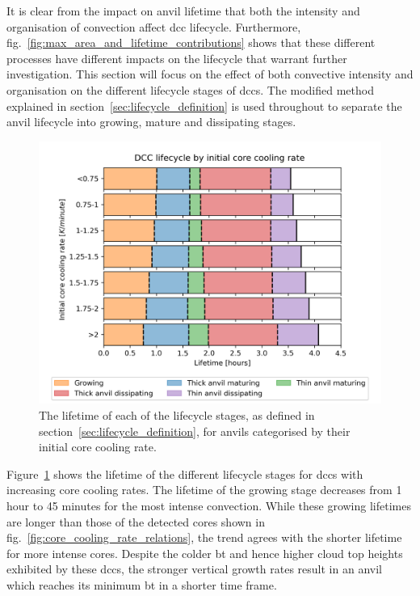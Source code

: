 It is clear from the impact on anvil lifetime that both the intensity and organisation of convection affect \acrshort{dcc} lifecycle.
Furthermore, fig.~\ref{fig:max_area_and_lifetime_contributions} shows that these different processes have different impacts on the lifecycle that warrant further investigation.
This section will focus on the effect of both convective intensity and organisation on the different lifecycle stages of \acrshort{dcc}s.
The modified \citeauthor{futyan_deep_2007} method explained in section~\ref{sec:lifecycle_definition} is used throughout to separate the anvil lifecycle into growing, mature and dissipating stages.

\begin{figure}[tp]
    \centering
    \includegraphics[width=\textwidth]{figures/chapter3_09.png}
    \caption[
    The average lifetime of each lifecycle stage for anvils categorised by their initial core cooling rate
    ]{
    The lifetime of each of the lifecycle stages, as defined in section~\ref{sec:lifecycle_definition}, for anvils categorised by their initial core cooling rate.
    }
    \label{fig:anvil_cooling_rate_absolute_lifecycle}
\end{figure}

Figure~\ref{fig:anvil_cooling_rate_absolute_lifecycle} shows the lifetime of the different lifecycle stages for \acrshort{dcc}s with increasing core cooling rates.
The lifetime of the growing stage decreases from 1 hour to 45 minutes for the most intense convection.
While these growing lifetimes are longer than those of the detected cores shown in fig.~\ref{fig:core_cooling_rate_relations}, the trend agrees with the shorter lifetime for more intense cores.
Despite the colder \acrshort{bt} and hence higher cloud top heights exhibited by these \acrshort{dcc}s, the stronger vertical growth rates result in an anvil which reaches its minimum \acrshort{bt} in a shorter time frame.

